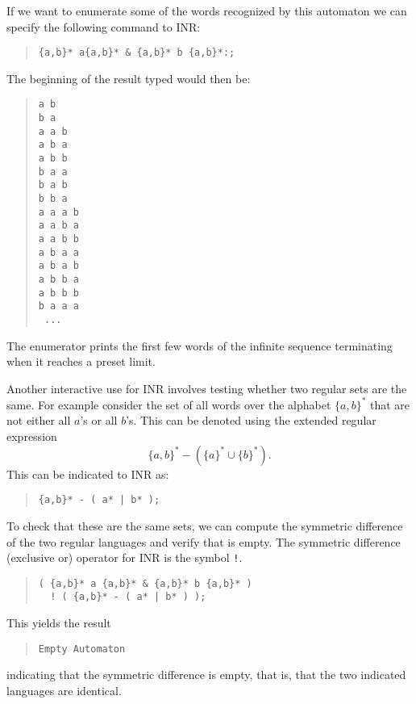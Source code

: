 If we want to enumerate some of the words recognized by this automaton we
can specify the following command to INR:
\begin{quote}
\begin{verbatim}
{a,b}* a{a,b}* & {a,b}* b {a,b}*:;
\end{verbatim}
\end{quote}
The beginning of the result typed would then be:
\begin{quote}
\begin{verbatim}
a b 
b a 
a a b 
a b a 
a b b 
b a a 
b a b 
b b a 
a a a b 
a a b a 
a a b b 
a b a a 
a b a b 
a b b a 
a b b b 
b a a a 
 ...
\end{verbatim}
\end{quote}
The enumerator prints the first few words of the infinite sequence
terminating when it reaches a preset limit.

Another interactive use for INR involves testing whether two regular sets
are the same.
For example consider the set of all words over the alphabet $\{a,b\}^*$
that are not either all $a$'s or all $b$'s.
This can be denoted using the extended regular expression
$$\{a,b\}^* - ( \{a\}^* \cup \{b\}^* ).$$
This can be indicated to INR as:
\begin{quote}
\begin{verbatim}
{a,b}* - ( a* | b* );
\end{verbatim}
\end{quote}
To check that these are the same sets, we can compute the symmetric
difference of the two regular languages and verify that is empty.
The symmetric difference (exclusive or) operator for INR is the symbol
{\tt !}.
\begin{quote}
\begin{verbatim}
( {a,b}* a {a,b}* & {a,b}* b {a,b}* )
  ! ( {a,b}* - ( a* | b* ) );
\end{verbatim}
\end{quote}
This yields the result
\begin{quote}
\begin{verbatim}
Empty Automaton
\end{verbatim}
\end{quote}
indicating that the symmetric difference is empty, that is, that the two
indicated languages are identical.

